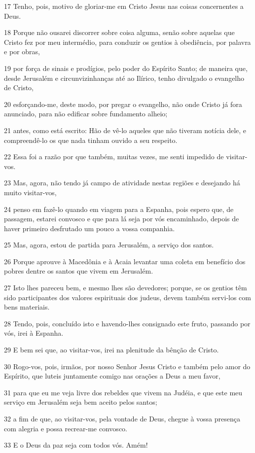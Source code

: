\par 17 Tenho, pois, motivo de gloriar-me em Cristo Jesus nas coisas concernentes a Deus.
\par 18 Porque não ousarei discorrer sobre coisa alguma, senão sobre aquelas que Cristo fez por meu intermédio, para conduzir os gentios à obediência, por palavra e por obras,
\par 19 por força de sinais e prodígios, pelo poder do Espírito Santo; de maneira que, desde Jerusalém e circunvizinhanças até ao Ilírico, tenho divulgado o evangelho de Cristo,
\par 20 esforçando-me, deste modo, por pregar o evangelho, não onde Cristo já fora anunciado, para não edificar sobre fundamento alheio;
\par 21 antes, como está escrito: Hão de vê-lo aqueles que não tiveram notícia dele, e compreendê-lo os que nada tinham ouvido a seu respeito.
\par 22 Essa foi a razão por que também, muitas vezes, me senti impedido de visitar-vos.
\par 23 Mas, agora, não tendo já campo de atividade nestas regiões e desejando há muito visitar-vos,
\par 24 penso em fazê-lo quando em viagem para a Espanha, pois espero que, de passagem, estarei convosco e que para lá seja por vós encaminhado, depois de haver primeiro desfrutado um pouco a vossa companhia.
\par 25 Mas, agora, estou de partida para Jerusalém, a serviço dos santos.
\par 26 Porque aprouve à Macedônia e à Acaia levantar uma coleta em benefício dos pobres dentre os santos que vivem em Jerusalém.
\par 27 Isto lhes pareceu bem, e mesmo lhes são devedores; porque, se os gentios têm sido participantes dos valores espirituais dos judeus, devem também servi-los com bens materiais.
\par 28 Tendo, pois, concluído isto e havendo-lhes consignado este fruto, passando por vós, irei à Espanha.
\par 29 E bem sei que, ao visitar-vos, irei na plenitude da bênção de Cristo.
\par 30 Rogo-vos, pois, irmãos, por nosso Senhor Jesus Cristo e também pelo amor do Espírito, que luteis juntamente comigo nas orações a Deus a meu favor,
\par 31 para que eu me veja livre dos rebeldes que vivem na Judéia, e que este meu serviço em Jerusalém seja bem aceito pelos santos;
\par 32 a fim de que, ao visitar-vos, pela vontade de Deus, chegue à vossa presença com alegria e possa recrear-me convosco.
\par 33 E o Deus da paz seja com todos vós. Amém!


